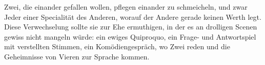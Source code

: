 Zwei, die einander gefallen wollen, pflegen einander zu schmeicheln, und zwar Jeder einer Specialität des Anderen, worauf der Andere gerade keinen Werth legt. Diese Verwechselung sollte sie zur Ehe ermuthigen, in der es an drolligen Scenen gewiss nicht mangeln würde: ein ewiges Quiproquo, ein Frage- und Antwortspiel mit verstellten Stimmen, ein Komödiengespräch, wo Zwei reden und die Geheimnisse von Vieren zur Sprache kommen.
\par

